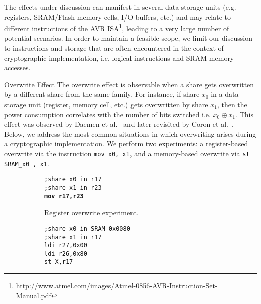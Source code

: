 The effects under discussion can manifest in several data storage units (e.g. registers, SRAM/Flash memory cells, I/O buffers, etc.) and may relate to different instructions of the AVR ISA\footnote{\url{http://www.atmel.com/images/Atmel-0856-AVR-Instruction-Set-Manual.pdf}}, leading to a very large number of potential scenarios. In order to maintain a feasible scope, we limit our discussion to instructions and storage that are often encountered in the context of cryptographic implementation, i.e. logical instructions and SRAM memory accesses.
\begin{subsection}{Overwrite Effect}
\label{overwrite}
The overwrite effect is observable when a share gets overwritten by a different share from the same family. For instance, if share $x_0$ in a data storage unit (register, memory cell, etc.) gets overwritten by share $x_1$, then the power consumption correlates with the number of bits switched i.e. $x_0 \oplus x_1$. This effect was observed by Daemen et al.~\cite{noteonsca} and later revisited by Coron et al.~\cite{DBLP:conf/cosade/CoronGPRRV12}.\\
 Below, we address the most common situations in which overwriting arises during a cryptographic implementation. We perform two experiments: a register-based overwrite via the instruction \texttt{mov x0, x1}, and a memory-based overwrite via \texttt{st SRAM\_x0 ,  x1}. 
\begin{figure}[H]
    \centering
\begin{subfigure}[b]{0.4\textwidth}
      \texttt{;share x0 in r17 \\
;share x1 in r23 \\
\textbf{mov r17,r23}\\
			}

        \caption{\scriptsize{Register overwrite experiment.}}

    \end{subfigure}
 \begin{subfigure}[b]{0.4\textwidth}
         \texttt{;share x0 in SRAM 0x0080 \\
;share x1 in r17  \\
ldi r27,0x00 \\
ldi r26,0x80 \\
st X,r17\\
}


\end{subfigure}
\end{figure}
\end{subsection}
